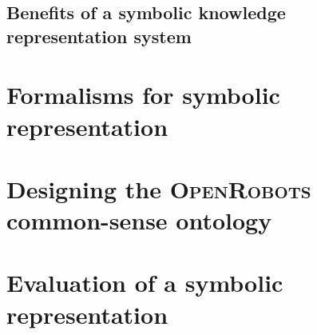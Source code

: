 \subsection{Benefits of a symbolic knowledge representation system}
\label{subssect|krs-benefits}

\section{Formalisms for symbolic representation}
\label{sect|formalisms}

\section{Designing the \textsc{OpenRobots} common-sense ontology}
\label{sect|commonsense-design}

\section{Evaluation of a symbolic representation }
\label{sect|krs-evaluation}

